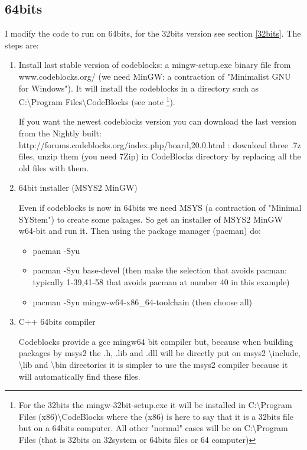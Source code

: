 \documentclass[amsmath,amssymb,nofootinbib]{revtex4-2}
\begin{document}
\subsection{64bits}

 I modify the code to run on 64bits, for the 32bits version see section \ref{32bits}.
The steps are:


\begin{enumerate}
	\item  Install last stable version of codeblocks: a mingw-setup.exe binary file from www.codeblocks.org/ (we need MinGW: a contraction of "Minimalist GNU for Windows").
	It will install the codeblocks in a directory such as C:\textbackslash{}Program Files\textbackslash{}CodeBlocks (see note \footnote{For the 32bits the  mingw-32bit-setup.exe  it will be installed in C:\textbackslash{}Program Files (x86)\textbackslash{}CodeBlocks where the (x86) is here to say that it is a 32bits file but on a 64bits computer. All other "normal" cases will be on C:\textbackslash{}Program Files (that is 32bits on 32system or 64bits files or 64 computer)}).
	

 If you want the
newest codeblocks version you can download the last version from the Nightly built: http://forums.codeblocks.org/index.php/board,20.0.html
: download three .7z files, unzip them (you need 7Zip) in CodeBlocks directory by replacing all the old files with them. 




	
	\item 64bit installer (MSYS2 MinGW)
	
	Even if codeblocks is now in 64bits we need  MSYS (a contraction of "Minimal SYStem") to create some pakages. So get an installer of  MSYS2 MinGW w64-bit and run it. Then using the package manager (pacman) do:
	\begin{itemize}
		\item  pacman -Syu 
		\item pacman -Syu base-devel (then make the selection that avoids pacman: typically 1-39,41-58 that avoids pacman at number 40 in this example)
		\item	pacman -Syu mingw-w64-x86\_64-toolchain (then choose all)
	\end{itemize}
	
	
	\item C++ 64bits compiler
	
	Codeblocks provide a gcc mingw64 bit compiler but,
because when building packages by msys2 the	.h, .lib and .dll will be directly put on msys2 \textbackslash{}include, \textbackslash{}lib and \textbackslash{}bin directories it is simpler to use the msys2 compiler because it will  automatically find these files.


\end{enumerate}
\end{document}
